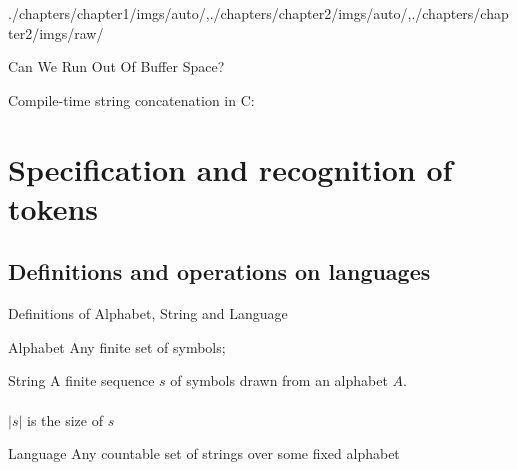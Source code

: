 \begin{graphicspathcontext}{{./chapters/chapter1/imgs/auto/},{./chapters/chapter2/imgs/auto/},{./chapters/chapter2/imgs/raw/}}
\begin{bibunit}[apalike]
\begin{frame}{{Can We Run Out Of} Buffer Space?}
	\begin{leftarrowsequence}
	\end{leftarrowsequence}
	\begin{example}
		Compile-time string concatenation in C: 
	\end{example}
\end{frame}


\section[Token Recognition]{Specification and recognition of tokens}
\sectiontableofcontentslide

\subsection{Definitions and operations on languages}
\subsectiontableofcontentslide

\begin{frame}{Definitions of Alphabet, String and Language}
	\begin{definitionblock}{Alphabet}
		Any finite set of symbols; 
	\end{definitionblock}
	\vspace{.25cm}
	\begin{definitionblock}{String}
		A finite sequence $s$ of symbols drawn from an alphabet $A$. \\
		 \\
		$|s|$ is the size of $s$
	\end{definitionblock}
	\vspace{.25cm}
	\begin{definitionblock}{Language}
		Any countable set of strings over some fixed alphabet \\
	\end{definitionblock}
\end{frame}


\end{bibunit}
\end{graphicspathcontext}
